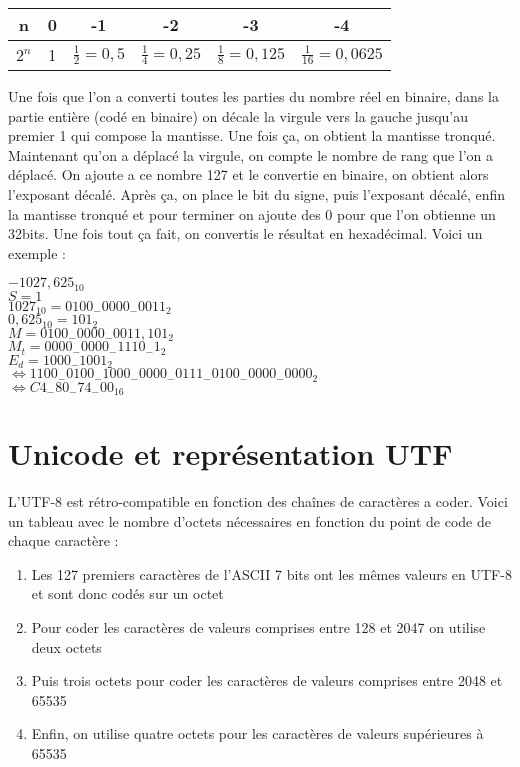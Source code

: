 \documentclass{article}
\begin{document}
		\begin{center}
			\begin{tabular}{ | c | c | c | c | c | c | }
  				\hline
  					n & 0 & -1 & -2 & -3 & -4 \\
  				\hline
  					$2^n$ & 1 & $\frac{1}{2} = 0,5$ & $\frac{1}{4} = 0,25$ & $\frac{1}{8} = 0,125$ & $\frac{1}{16} = 0,0625$ \\
	  			\hline
		
			\end{tabular}
		\end{center}
	
		Une fois que l'on a converti toutes les parties du nombre réel en binaire, dans la partie entière (codé en binaire) on décale la virgule vers la gauche jusqu'au premier 1 qui compose la mantisse. Une fois ça, on obtient la mantisse tronqué. Maintenant qu'on a déplacé la virgule, on compte le nombre de rang que l'on a déplacé. On ajoute a ce nombre 127 et le convertie en binaire, on obtient alors l'exposant décalé. Après ça, on place le bit du signe, puis l'exposant décalé, enfin la mantisse tronqué et pour terminer on ajoute des 0 pour que l'on obtienne un 32bits. Une fois tout ça fait, on convertis le résultat en hexadécimal. Voici un exemple :
		
		\begin{center}
			$-1027,625_{10}$ \\
			$S = 1$ \\
			$1027_{10} = 0100_-0000_-0011_2$ \\
			$0,625_{10} = 101_2$ \\
			$M = 0100_-0000_-0011,101_2$ \\
			$M_t=0000_-0000_-1110_-1_2$ \\
			$E_d=1000_-1001_2$ \\
			$\iff 1100_-0100_-1000_-0000_-0111_-0100_-0000_-0000_2$ \\
			$\iff C4_-80_-74_-00_{16}$
		\end{center} 
				
		\section{Unicode et représentation UTF}
			L'UTF-8 est rétro-compatible en fonction des chaînes de caractères a coder. Voici un tableau avec le nombre d'octets nécessaires en fonction du point de code de chaque caractère : 
		
			\begin{enumerate}
				\item Les 127 premiers caractères de l'ASCII 7 bits ont les mêmes valeurs en UTF-8 et sont donc codés sur un octet
				\item Pour coder les caractères de valeurs comprises entre 128 et 2047 on utilise deux octets
				\item Puis trois octets pour coder les caractères de valeurs comprises entre 2048 et 65535
				\item Enfin, on utilise quatre octets pour les caractères de valeurs supérieures à 65535
			\end{enumerate}
			
\end{document}
